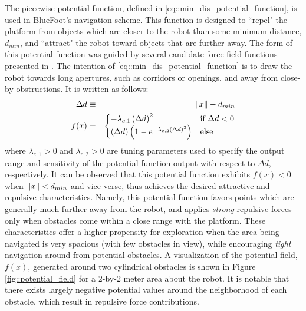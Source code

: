 			The piecewise potential function, defined in \ref{eq::min_dis_potential_function}, is used in BlueFoot's navigation scheme. This function is designed to ``repel" the platform from objects which are closer to the robot than some minimum distance, $d_{min}$, and ``attract" the robot toward objects that are further away. The form of this potential function was guided by several candidate force-field functions presented in \cite{ArambulaCosio2004}. The intention of \ref{eq::min_dis_potential_function} is to draw the robot towards long apertures, such as corridors or openings, and away from close-by obstructions. It is written as follows:
				\begin{eqnarray}
					\Delta d &\equiv& \left\lVert x\right\rVert-d_{min} \nonumber \\
					f(x) &=& 
					\begin{cases}	
					 	 -\lambda_{c,1} \left(\Delta d\right)^{2} &  \text{if } \Delta d < 0 \\
						\left(\Delta d\right) \left( 1  - e^{ -  \lambda_{c,2} { \left(\Delta d\right) }^{2} } \right) 	&  \text{else}
					\end{cases}
				\label{eq::min_dis_potential_function}
				\end{eqnarray}
			where $\lambda_{c,1}>0$ and $\lambda_{c,2}>0$ are tuning parameters used to specify the output range and sensitivity of the potential function output with respect to $\Delta d$, respectively. It can be observed that this potential function exhibits $f(x)<0$ when $\left\lVert x\right\rVert < d_{min}$ and vice-verse, thus achieves the desired attractive and repulsive characteristics. Namely, this potential function favors points which are generally much further away from the robot, and applies \emph{strong} repulsive forces only when obstacles come within a close range with the platform. These characteristics offer a higher propensity for exploration when the area being navigated is very spacious (with few obstacles in view), while encouraging \emph{tight} navigation around from potential obstacles. A visualization of the potential field, $f(x)$, generated around two cylindrical obstacles is shown in Figure \ref{fig::potential_field} for a $2$-by-$2$ meter area about the robot. It is notable that there exists largely negative potential values around the neighborhood of each obstacle, which result in repulsive force contributions.
